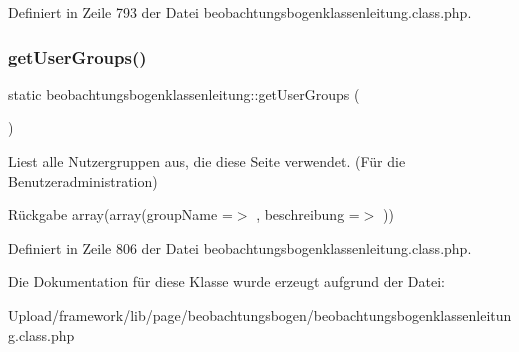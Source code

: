 Definiert in Zeile 793 der Datei beobachtungsbogenklassenleitung.\+class.\+php.

\mbox{\label{classbeobachtungsbogenklassenleitung_a11080113d5f14e963e5dabf12eb2fca2}} 
\subsubsection{\texorpdfstring{get\+User\+Groups()}{getUserGroups()}}
{\footnotesize\ttfamily static beobachtungsbogenklassenleitung\+::get\+User\+Groups (\begin{DoxyParamCaption}{ }\end{DoxyParamCaption})\hspace{0.3cm}{\ttfamily [static]}}

Liest alle Nutzergruppen aus, die diese Seite verwendet. (Für die Benutzeradministration) \begin{DoxyReturn}{Rückgabe}
array(array(\textquotesingle{}group\+Name\textquotesingle{} =$>$ \textquotesingle{}\textquotesingle{}, \textquotesingle{}beschreibung\textquotesingle{} =$>$ \textquotesingle{}\textquotesingle{})) 
\end{DoxyReturn}


Definiert in Zeile 806 der Datei beobachtungsbogenklassenleitung.\+class.\+php.



Die Dokumentation für diese Klasse wurde erzeugt aufgrund der Datei\+:\begin{DoxyCompactItemize}
\item 
Upload/framework/lib/page/beobachtungsbogen/beobachtungsbogenklassenleitung.\+class.\+php\end{DoxyCompactItemize}
